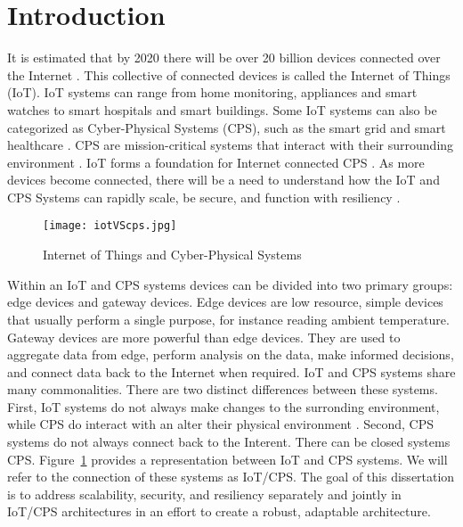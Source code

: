 \documentclass[../main.tex]{subfiles}
\begin{document}
\section{Introduction}

It is estimated that by 2020 there will be over 20 billion devices connected over the Internet \cite{gartner, juniper-research,stats-iot}. This collective of connected devices is called the Internet of Things (IoT). IoT systems can range from home monitoring, appliances and smart watches to smart hospitals and smart buildings. Some IoT systems can also be categorized as Cyber-Physical Systems (CPS), such as the smart grid and smart healthcare \cite{ideas2020,els,k-ieee}. CPS are mission-critical systems that interact with their surrounding environment \cite{shi2011survey, baheti2011cyber,banerjee2012ensuring}. IoT forms a foundation for Internet connected CPS \cite{k-ieee}. As more devices become connected, there will be a need to understand how the IoT and CPS Systems can rapidly scale, be secure, and function with resiliency \cite{6803220,7275445}. 


\begin{figure}[!htb]
    \centering
    \texttt{[image: iotVScps.jpg]}
    \caption{Internet of Things and Cyber-Physical Systems}
    \label{fig:iot-v-cps}
\end{figure}

Within an IoT and CPS systems devices can be divided into two primary groups: edge devices and gateway devices. Edge devices are low resource, simple devices that usually perform a single purpose, for instance reading ambient temperature. Gateway devices are more powerful than edge devices. They are used to aggregate data from edge, perform analysis on the data, make informed decisions, and connect data back to the Internet when required. IoT and CPS systems share many commonalities. There are two distinct differences between these systems. First, IoT systems do not always make changes to the surronding environment, while CPS do interact with an alter their physical environment \cite{els, k-ieee}. Second, CPS systems do not always connect back to the Interent. There can be closed systems CPS. Figure~\ref{fig:iot-v-cps} provides a representation between IoT and CPS systems. We will refer to the connection of these systems as IoT/CPS. The goal of this dissertation is to address scalability, security, and resiliency separately and jointly in IoT/CPS architectures in an effort to create a robust, adaptable architecture. 
\end{document}
